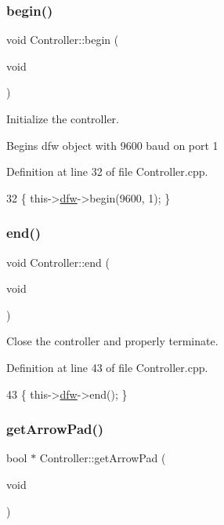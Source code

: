 \subsubsection{\texorpdfstring{begin()}{begin()}}
{\footnotesize\ttfamily void Controller\+::begin (\begin{DoxyParamCaption}\item[{void}]{ }\end{DoxyParamCaption})}



Initialize the controller. 

Begins dfw object with 9600 baud on port 1 

Definition at line 32 of file Controller.\+cpp.


\begin{DoxyCode}
32 \{ this->\hyperlink{class_controller_af4793ccbf2ecdbfcdb9359bd32b6e8cf}{dfw}->begin(9600, 1); \}
\end{DoxyCode}
\mbox{\label{class_controller_a7cdeade73d459b6a3279b9d0e2598117}} 
\subsubsection{\texorpdfstring{end()}{end()}}
{\footnotesize\ttfamily void Controller\+::end (\begin{DoxyParamCaption}\item[{void}]{ }\end{DoxyParamCaption})}



Close the controller and properly terminate. 



Definition at line 43 of file Controller.\+cpp.


\begin{DoxyCode}
43 \{ this->\hyperlink{class_controller_af4793ccbf2ecdbfcdb9359bd32b6e8cf}{dfw}->end(); \}
\end{DoxyCode}
\mbox{\label{class_controller_a3f3c5959101f909d3ff951a6b9cf77ee}} 
\subsubsection{\texorpdfstring{get\+Arrow\+Pad()}{getArrowPad()}}
{\footnotesize\ttfamily bool $\ast$ Controller\+::get\+Arrow\+Pad (\begin{DoxyParamCaption}\item[{void}]{ }\end{DoxyParamCaption})}



